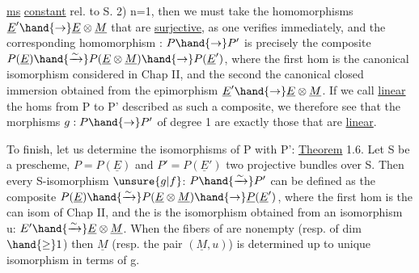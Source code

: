 
\uline{ms} \uline{constant} rel. to S. 2) n=1, then we must take the homomorphisms
 $\underline{E}'\hand{\to} \underline{E}\otimes\underline{M}$ that are \uline{surjective}, as one verifies
immediately, and the corresponding homomorphism : $P\hand{\to} P'$ is precisely the
composite $P(\underline{E})\hand{\xrightarrow{\sim}}P(\underline{E}\otimes\underline{M})\hand{\to} P(\underline{E}')$, where the first hom is the canonical
isomorphism considered in Chap II, and the second the canonical closed immersion
obtained from the epimorphism $\underline{E}'\hand{\to}\underline{E}\otimes\underline{M}$. If we call \uline{linear}
the homs from P to P' described as such a composite, we therefore see
that the morphisms $g:P\hand{\to} P'$ of degree 1 are exactly those that
are \uline{linear}.

To finish, let us determine the isomorphisms of P with P':
\uline{Theorem} 1.6. Let S be a prescheme, $P=P(\underline{E})$ and $P'=P(\underline{E}')$ two projective
bundles over S. Then every S-isomorphism $\unsure{g|f}$: $P\hand{\xrightarrow{\sim}}P'$ can be defined
as the composite $P(\underline{E})\hand{\xrightarrow{\sim}}P(\underline{E}\otimes\underline{M})\hand{\to} \underline{P}(\underline{E}')$, where the first hom is the can
isom of Chap II, and the  is the  isomorphism obtained
from an isomorphism u: $E'\hand{\xrightarrow{\sim}}\underline{E}\otimes\underline{M}$. When the fibers of  are
nonempty (resp. of dim $\hand{\geq} 1$) then $\underline{M}$ (resp. the pair $(\underline{M},u)$) is determined
up to unique isomorphism in terms of g.

